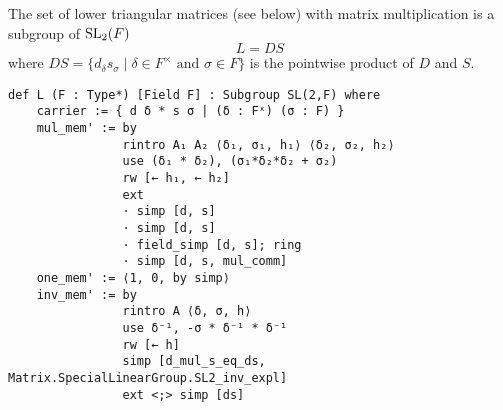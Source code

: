 \begin{definition}
\label{SpecialSubgroups.L}
\leanok
    The set of lower triangular matrices (see below) with matrix multiplication is a subgroup of $\operatorname{SL}_2(F)$
    \[
    L = DS
    \]
    where $DS = \{d_\delta s_\sigma \; | \; \delta \in F^\times \text{ and } \sigma \in F \}$ is the pointwise product of $D$ and $S$.
\end{definition}
\begin{footnotesize}
\begin{verbatim}
def L (F : Type*) [Field F] : Subgroup SL(2,F) where
    carrier := { d δ * s σ | (δ : Fˣ) (σ : F) }
    mul_mem' := by
                rintro A₁ A₂ ⟨δ₁, σ₁, h₁⟩ ⟨δ₂, σ₂, h₂⟩
                use (δ₁ * δ₂), (σ₁*δ₂*δ₂ + σ₂)
                rw [← h₁, ← h₂]
                ext
                · simp [d, s]
                · simp [d, s]
                · field_simp [d, s]; ring
                · simp [d, s, mul_comm]
    one_mem' := ⟨1, 0, by simp⟩
    inv_mem' := by
                rintro A ⟨δ, σ, h⟩
                use δ⁻¹, -σ * δ⁻¹ * δ⁻¹
                rw [← h]
                simp [d_mul_s_eq_ds, Matrix.SpecialLinearGroup.SL2_inv_expl]
                ext <;> simp [ds]
\end{verbatim}
\end{footnotesize}

